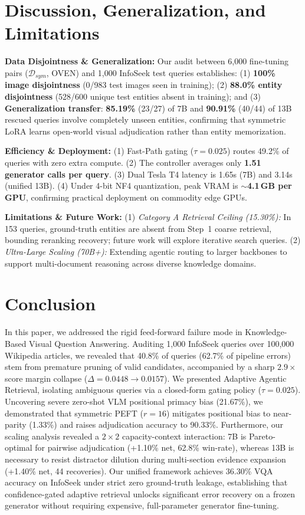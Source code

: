 \documentclass[conference]{IEEEtran}
\begin{document}
\section{Discussion, Generalization, and Limitations}

\textbf{Data Disjointness \& Generalization:} Our audit between 6,000 fine-tuning pairs ($\mathcal{D}_{sym}$, OVEN) and 1,000 InfoSeek test queries establishes: (1) \textbf{100\% image disjointness} (0/983 test images seen in training); (2) \textbf{88.0\% entity disjointness} (528/600 unique test entities absent in training); and (3) \textbf{Generalization transfer}: \textbf{85.19\%} (23/27) of 7B and \textbf{90.91\%} (40/44) of 13B rescued queries involve completely unseen entities, confirming that symmetric LoRA learns open-world visual adjudication rather than entity memorization.

\textbf{Efficiency \& Deployment:}
(1) Fast-Path gating ($\tau = 0.025$) routes 49.2\% of queries with zero extra compute. (2) The controller averages only \textbf{1.51 generator calls per query}. (3) Dual Tesla T4 latency is 1.65s (7B) and 3.14s (unified 13B). (4) Under 4-bit NF4 quantization, peak VRAM is $\sim$\textbf{4.1\,GB per GPU}, confirming practical deployment on commodity edge GPUs.

\textbf{Limitations \& Future Work:}
(1) \textit{Category A Retrieval Ceiling (15.30\%):} In 153 queries, ground-truth entities are absent from Step~1 coarse retrieval, bounding reranking recovery; future work will explore iterative search queries. (2) \textit{Ultra-Large Scaling (70B+):} Extending agentic routing to larger backbones to support multi-document reasoning across diverse knowledge domains.


\section{Conclusion}
In this paper, we addressed the rigid feed-forward failure mode in Knowledge-Based Visual Question Answering. Auditing 1,000 InfoSeek queries over 100,000 Wikipedia articles, we revealed that 40.8\% of queries (62.7\% of pipeline errors) stem from premature pruning of valid candidates, accompanied by a sharp $2.9\times$ score margin collapse ($\Delta = 0.0448 \to 0.0157$). We presented Adaptive Agentic Retrieval, isolating ambiguous queries via a closed-form gating policy ($\tau = 0.025$). Uncovering severe zero-shot VLM positional primacy bias (21.67\%), we demonstrated that symmetric PEFT ($r=16$) mitigates positional bias to near-parity (1.33\%) and raises adjudication accuracy to 90.33\%. Furthermore, our scaling analysis revealed a $2 \times 2$ capacity-context interaction: 7B is Pareto-optimal for pairwise adjudication (+1.10\% net, 62.8\% win-rate), whereas 13B is necessary to resist distractor dilution during multi-section evidence expansion (+1.40\% net, 44 recoveries). Our unified framework achieves 36.30\% VQA accuracy on InfoSeek under strict zero ground-truth leakage, establishing that confidence-gated adaptive retrieval unlocks significant error recovery on a frozen generator without requiring expensive, full-parameter generator fine-tuning.



\end{document}
